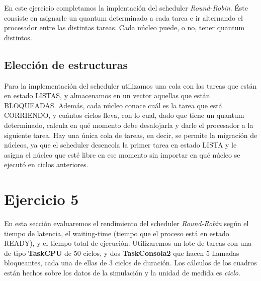 \documentclass[11pt]{article}
\begin{document}
  En este ejercicio completamos la implentación del scheduler \textit{Round-Robin}. Éste consiste en asignarle un quantum determinado a cada tarea e ir alternando el procesador entre las distintas tareas. Cada núcleo puede, o no, tener quantum distintos. 

  \subsection{Elección de estructuras}

  Para la implementación del scheduler utilizamos una cola con las tareas que están en estado LISTAS, y almacenamos en un vector aquellas que están BLOQUEADAS. Además, cada núcleo conoce cuál es la tarea que está CORRIENDO, y cuántos ciclos lleva, con lo cual, dado que tiene un quantum determinado, calcula en qué momento debe desalojarla y darle el procesador a la siguiente tarea.
  Hay una única cola de tareas, en decir, se permite la migración de núcleos, ya que el scheduler desencola la primer tarea en estado LISTA y le asigna el núcleo que esté libre en ese momento sin importar en qué núcleo se ejecutó en ciclos anteriores. 

  \newpage

  \section{Ejercicio 5}

  En esta sección evaluaremos el rendimiento del scheduler \textit{Round-Robin} según el tiempo de latencia, el waiting-time (tiempo que el proceso está en estado READY), y el tiempo total de ejecución. Utilizaremos un lote de tareas con una de tipo \textbf{TaskCPU} de 50 ciclos, y dos \textbf{TaskConsola2} que hacen 5 llamadas bloqueantes, cada una de ellas de 3 ciclos de duración. 
  Los cálculos de los cuadros están hechos sobre los datos de la simulación y la unidad de medida es \textit{ciclo}. \\

\end{document}
